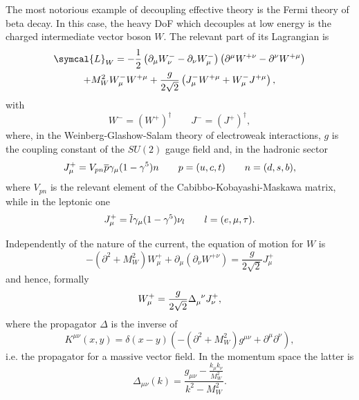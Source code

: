 The most notorious example of decoupling effective theory is the Fermi theory of beta decay. In this case, the heavy DoF which decouples at low energy is the charged intermediate vector boson $W$. The relevant part of its Lagrangian is 
\begin{multline}
  \symcal{L}_W = - \frac{1}{2} \left( \partial_\mu W^-_\nu - \partial_\nu W^-_\mu \right) \left( \partial^\mu W^{+ \nu} - \partial^\nu W^{+ \mu} \right) \\ + M_W^2 W^-_\mu W^{+ \mu} + \frac{g}{2 \sqrt{2}} \left( J^-_\mu W^{+ \mu} + W^-_\mu J^{+ \mu} \right) ,
\end{multline}
with
\begin{equation}
  W^- = (W^+)^\dagger \qquad J^- = (J^+)^\dagger ,
\end{equation}
where, in the Weinberg-Glashow-Salam theory of electroweak interactions, $g$ is the coupling constant of the $SU(2)$ gauge field and, in the hadronic sector
\begin{equation}
  J^+_\mu = V_{p n} \overline{p} \gamma_\mu ( 1 - \gamma^5 ) n \qquad p = (u, c, t) \qquad n = (d, s, b) ,
\end{equation}
where $V_{p n}$ is the relevant element of the Cabibbo-Kobayashi-Maskawa matrix, while in the leptonic one
\begin{equation}
  J^+_\mu = \overline{l} \gamma_\mu ( 1 - \gamma^5 ) \nu_l \qquad l = (e, \mu, \tau) . 
\end{equation}

Independently of the nature of the current, the equation of motion for $W$ is 
\begin{equation}
  - ( \partial^2 + M^2_W ) W^+_\mu + \partial_\mu ( \partial_\nu W^{+ \nu} ) = \frac{g}{2 \sqrt{2}} J^+_\mu
\end{equation}
and hence, formally
\begin{equation}
  W^+_\mu = \frac{g}{2 \sqrt{2}} \Delta\indices{_\mu^\nu} J^+_\nu ,
\end{equation}
where the propagator $\Delta$ is the inverse of
\begin{equation}
  K^{\mu \nu}(x, y) = \delta(x - y) \left( - \left( \partial^2 + M_W^2 \right) g^{\mu \nu} + \partial^\mu \partial^\nu \right) ,
\end{equation}
i.e. the propagator for a massive vector field. In the momentum space the latter is
\begin{equation}
  \Delta_{\mu \nu}(k) = \frac{g_{\mu \nu} - \frac{k_\mu k_\nu}{M^2_W}}{k^2 - M^2_W} .
\end{equation}

